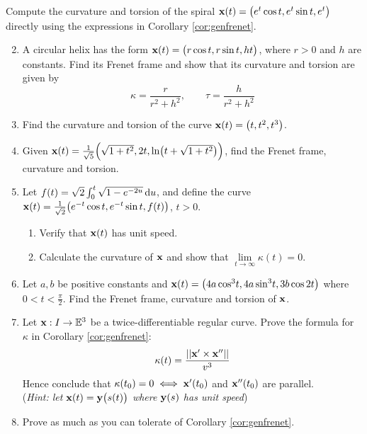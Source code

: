 \begin{exercises}
\exstart Compute the curvature and torsion of the spiral ${\mathbf{x}}(t)=\bigl(e^t\cos t,e^t\sin t,e^t\bigr)$ directly using the expressions in Corollary \ref{cor:genfrenet}.


\begin{enumerate}\setcounter{enumi}{1}
	\item\label{exs:genhelixcurv} A circular helix has the form ${\mathbf{x}}(t)=\bigl(r\cos t,r\sin t,ht\bigr)$, where $r>0$ and $h$ are constants. Find its Frenet frame and show that its curvature and torsion are given by
  \[\kappa=\frac{r}{r^2+h^2},\qquad\tau=\frac{h}{r^2+h^2}\]


	\item Find the curvature and torsion of the curve ${\mathbf{x}}(t)=\bigl(t,t^2,t^3\bigr)$. 

  
  \item Given ${\mathbf{x}}(t)=\frac 1{\sqrt 5}\Bigl(\sqrt{1+t^2}, 2t ,\ln\bigl(t+\sqrt{1+t^2}\bigr)\Bigr)$, find the Frenet frame, curvature and torsion.
  
  
  \item Let $f(t)=\sqrt 2\int_0^t\sqrt{1-e^{-2u}}\,{\mathrm{d} u}$, and define the curve ${\mathbf{x}}(t)=\frac 1{\sqrt 2}\bigl(e^{-t}\cos t, e^{-t}\sin t, f(t)\bigr)$, $t>0$.
  \begin{enumerate}
    \item Verify that ${\mathbf{x}}(t)$ has unit speed.
    \item Calculate the curvature of ${\mathbf{x}}$ and show that $\lim\limits_{t\to\infty}\kappa(t)=0$.
  \end{enumerate}
  
  
  \item Let $a,b$ be positive constants and ${\mathbf{x}}(t)=\bigl(4a\cos^3\!t, 4a\sin^3\!t, 3b\cos 2t\bigr)$ where $0<t<\frac\pi 2$. Find the Frenet frame, curvature and torsion of ${\mathbf{x}}$.
  
  
  \item Let ${\mathbf{x}}:I\to\mathbb{E}^3$ be a twice-differentiable regular curve. Prove the formula for $\kappa$ in Corollary \ref{cor:genfrenet}:
  \[\kappa(t)=\frac{\left| \left| {\mathbf{x}}'\times{\mathbf{x}}''\right|\right|}{v^3}\]
  Hence conclude that $\kappa(t_0)=0\iff{\mathbf{x}}'(t_0)$ and ${\mathbf{x}}''(t_0)$ are parallel.\\
	(\emph{Hint: let ${\mathbf{x}}(t)={\mathbf{y}}\bigl(s(t)\bigr)$ where ${\mathbf{y}}(s)$ has unit speed})
  
  \item Prove as much as you can tolerate of Corollary \ref{cor:genfrenet}.


\end{enumerate}
\end{exercises}
